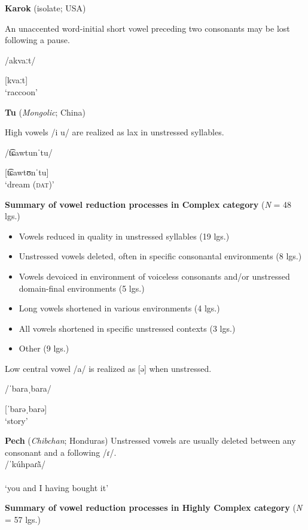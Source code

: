 \ea   \textbf{Karok} (isolate; USA)

An unaccented word-initial short vowel preceding two consonants may be lost following a pause.

/akvaːt/

[kvaːt]\\
\glt ‘raccoon’
\citep[53]{Bright1957}

\ex  \textbf{Tu} (\textit{Mongolic}; China)

High vowels /i u/ are realized as lax in unstressed syllables. 

/t͡ɕawtunˈtu/

[t͡ɕawtʊnˈtu]\\
\glt ‘dream (\textsc{dat})’
\citep[35]{Slater2003}
\z
\z

\ea\label{ex:6.18}
  \textbf{Summary of vowel reduction processes in Complex category} (\textit{N} = 48 lgs.)

\begin{itemize}
\item Vowels reduced in quality in unstressed syllables (19 lgs.)
\item Unstressed vowels deleted, often in specific consonantal environments (8 lgs.)
\item Vowels devoiced in environment of voiceless consonants and/or unstressed domain-final environments  {(5 lgs.)}
\item Long vowels shortened in various environments  {(4 lgs.)}
\item All vowels shortened in specific unstressed contexts (3 lgs.)
\item Other (9 lgs.)
\end{itemize}

\ea{}

Low central vowel /a/ is realized as [ə] when unstressed.

/ˈbaraˌbara/

[ˈbarəˌbarə]\\
\glt ‘story’
\citep[17-18]{Rumsey1978}

\ex  \textbf{Pech} (\textit{Chibchan}; Honduras)
Unstressed vowels are usually deleted between any consonant and a following /ɾ/.\\
/ˈkúhpaɾ\`{ã}/\\\relax
[ˈkúhpɾ\`{ã}]\\
\glt ‘you and I having bought it’
\citep[23]{Holt1999}
\z
\z

\ea\label{ex:6.19}
  \textbf{Summary of vowel reduction processes in Highly Complex category} (\textit{N} = 57 lgs.)

